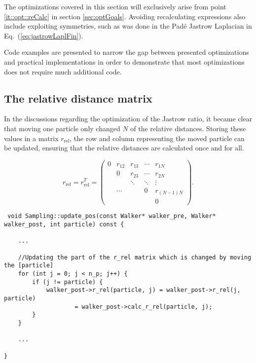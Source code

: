 The optimizations covered in this section will exclusively arise from point \ref{it::opt::reCalc} in section \ref{sec:optGoals}. Avoiding recalculating expressions also include exploiting symmetries, such as was done in the Padé Jastrow Laplacian in Eq.~(\ref{eq:jastrowLaplFin}).

Code examples are presented to narrow the gap between presented optimizations and practical implementations in order to demonstrate that most optimizations does not require much additional code.

\subsection{The relative distance matrix}

In the discussions regarding the optimization of the Jastrow ratio, it became clear that moving one particle only changed $N$ of the relative distances. Storing these values in a matrix $r_\mathrm{rel}$, the row and column representing the moved particle can be updated, ensuring that the relative distances are calculated once and for all.

\begin{equation}
r_\mathrm{rel} = r_\mathrm{rel}^T = \left( \begin{array}{ccccc}
0 & r_{12} & r_{13} & \cdots & r_{1N} \\
 & 0 & r_{23} & \cdots & r_{2N}  \\
 &  & \ddots & \ddots & \vdots \\
 & \cdots &  & 0 & r_{(N-1)N} \\
 &  &  &  & 0\end{array} \right).
\end{equation}

\vspace{0.5cm}
\begin{lstlisting}
 void Sampling::update_pos(const Walker* walker_pre, Walker* walker_post, int particle) const {

    ...

    //Updating the part of the r_rel matrix which is changed by moving the [particle]
    for (int j = 0; j < n_p; j++) {
        if (j != particle) {
            walker_post->r_rel(particle, j) = walker_post->r_rel(j, particle)
                    = walker_post->calc_r_rel(particle, j);
        }
    }
    
    ...

}
\end{lstlisting}


